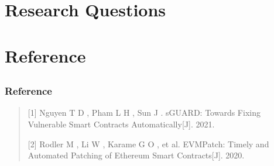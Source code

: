 \documentclass[notheorems, aspectratio=54]{beamer}
\def\parchmentframe#1{
\tikz{
  \node[inner sep=2em] (A) {#1};  %
  \begin{pgfonlayer}{background}  %
  \fill[normal border] 
        (A.south east) -- (A.south west) -- 
        (A.north west) -- (A.north east) -- cycle;
  \end{pgfonlayer}}}
\def\parchmentframetop#1{
\tikz{
  \node[inner sep=2em] (A) {#1};    %
  \begin{pgfonlayer}{background}    
  \fill[normal border]              %
        (A.south east) -- (A.south west) -- 
        (A.north west) -- (A.north east) -- cycle;
  \fill[torn border]                %
        ($(A.south east)-(0,.2)$) -- ($(A.south west)-(0,.2)$) -- 
        ($(A.south west)+(0,.2)$) -- ($(A.south east)+(0,.2)$) -- cycle;
  \end{pgfonlayer}}}
\def\parchmentframebottom#1{
\tikz{
  \node[inner sep=2em] (A) {#1};   %
  \begin{pgfonlayer}{background}   
  \fill[normal border]             %
        (A.south east) -- (A.south west) -- 
        (A.north west) -- (A.north east) -- cycle;
  \fill[torn border]               %
        ($(A.north east)-(0,.2)$) -- ($(A.north west)-(0,.2)$) -- 
        ($(A.north west)+(0,.2)$) -- ($(A.north east)+(0,.2)$) -- cycle;
  \end{pgfonlayer}}}
\def\parchmentframemiddle#1{
\tikz{
  \node[inner sep=2em] (A) {#1};   %
  \begin{pgfonlayer}{background}   
  \fill[normal border]             %
        (A.south east) -- (A.south west) -- 
        (A.north west) -- (A.north east) -- cycle;
  \fill[torn border]               %
        ($(A.south east)-(0,.2)$) -- ($(A.south west)-(0,.2)$) -- 
        ($(A.south west)+(0,.2)$) -- ($(A.south east)+(0,.2)$) -- cycle;
  \fill[torn border]               %
        ($(A.north east)-(0,.2)$) -- ($(A.north west)-(0,.2)$) -- 
        ($(A.north west)+(0,.2)$) -- ($(A.north east)+(0,.2)$) -- cycle;
  \end{pgfonlayer}}}
\newenvironment{parchment}[1][Example]{%
  \def\FrameCommand{\parchmentframe}%
  \def\FirstFrameCommand{\parchmentframetop}%
  \def\LastFrameCommand{\parchmentframebottom}%
  \def\MidFrameCommand{\parchmentframemiddle}%
  \vskip\baselineskip
  \MakeFramed {\FrameRestore}
  \noindent\tikz\node[inner sep=1ex, draw=black!20,fill=white, 
          anchor=west, overlay] at (0em, 2em) {\sffamily#1};\par}%
{\endMakeFramed}
\begin{document}

\section{Research Questions}
\subsection{}


\section{Reference}
\subsection{}
\begin{frame}
    \frametitle{Reference}
    
    \begin{quotation}
        [1] Nguyen T D ,  Pham L H ,  Sun J . sGUARD: Towards Fixing Vulnerable Smart Contracts Automatically[J].  2021.

        [2] Rodler M ,  Li W ,  Karame G O , et al. EVMPatch: Timely and Automated Patching of Ethereum Smart Contracts[J].  2020.
    \end{quotation}

\end{frame}
\end{document}
